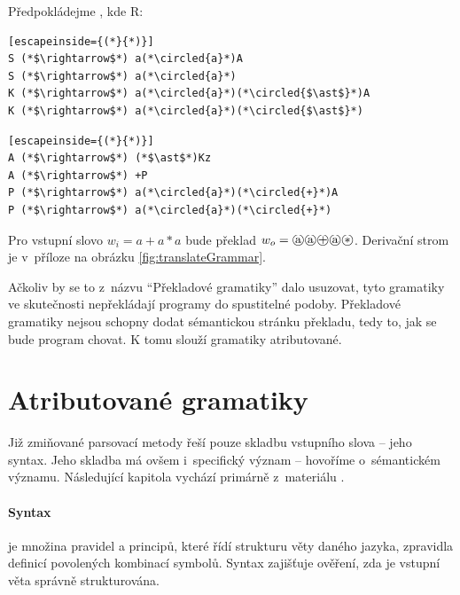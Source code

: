 		Předpokládejme , kde R:
		\begin{center}
			\begin{minipage}{.45\textwidth}
				\begin{lstlisting}[escapeinside={(*}{*)}]  
S (*$\rightarrow$*) a(*\circled{a}*)A
S (*$\rightarrow$*) a(*\circled{a}*)
K (*$\rightarrow$*) a(*\circled{a}*)(*\circled{$\ast$}*)A
K (*$\rightarrow$*) a(*\circled{a}*)(*\circled{$\ast$}*)
				\end{lstlisting}
			\end{minipage}
			\hfill
			\begin{minipage}{.45\textwidth}
				\begin{lstlisting}[escapeinside={(*}{*)}]  
A (*$\rightarrow$*) (*$\ast$*)Kz
A (*$\rightarrow$*) +P
P (*$\rightarrow$*) a(*\circled{a}*)(*\circled{+}*)A
P (*$\rightarrow$*) a(*\circled{a}*)(*\circled{+}*)
				\end{lstlisting}
			\end{minipage}
		\end{center}
	
		Pro vstupní slovo $w_i=a + a \ast a$ bude překlad $w_o=\circled{a}\circled{a}\circled{+}\circled{a}\circled{$\ast$}$. Derivační strom je v~příloze na obrázku \ref{fig:translateGrammar}.
		
		Ačkoliv by se to z~názvu \enquote{Překladové gramatiky} dalo usuzovat, tyto gramatiky ve skutečnosti nepřekládají programy do spustitelné podoby. Překladové gramatiky nejsou schopny dodat sémantickou stránku překladu, tedy to, jak se bude program chovat. K tomu slouží gramatiky atributované.
		
	\section{Atributované gramatiky}
		Již zmiňované parsovací metody řeší pouze skladbu vstupního slova -- jeho syntax. Jeho skladba má ovšem i~specifický význam -- hovoříme o~sémantickém významu. Následující kapitola vychází primárně z~materiálu \cite{4308414}.
		
		\paragraph{Syntax}
		je množina pravidel a principů, které řídí strukturu věty daného jazyka, zpravidla definicí povolených kombinací symbolů. Syntax zajišťuje ověření, zda je vstupní věta správně strukturována.
		
